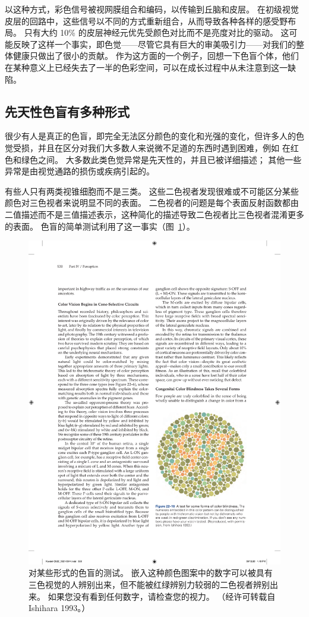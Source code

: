 以这种方式，彩色信号被视网膜组合和编码，以传输到丘脑和皮层。
在初级视觉皮层的回路中，这些信号以不同的方式重新组合，从而导致各种各样的感受野布局。
只有大约 10\% 的皮层神经元优先受颜色对比而不是亮度对比的驱动。
这可能反映了这样一个事实，即色觉——尽管它具有巨大的审美吸引力——对我们的整体健康只做出了很小的贡献。
作为这方面的一个例子，回想一下色盲个体，他们在某种意义上已经失去了一半的色彩空间，可以在成长过程中从未注意到这一缺陷。



\subsection{先天性色盲有多种形式}

很少有人是真正的色盲，即完全无法区分颜色的变化和光强的变化，但许多人的色觉受损，并且在区分对我们大多数人来说微不足道的东西时遇到困难，例如 在红色和绿色之间。
大多数此类色觉异常是先天性的，并且已被详细描述；
其他一些异常是由视觉通路的损伤或疾病引起的。


有些人只有两类视锥细胞而不是三类。
这些二色视者发现很难或不可能区分某些颜色对三色视者来说明显不同的表面。
二色视者的问题是每个表面反射函数都由二值描述而不是三值描述表示，这种简化的描述导致二色视者比三色视者混淆更多的表面。
色盲的简单测试利用了这一事实（图~\ref{fig:22_16}）。


\begin{figure}[htbp]
	\centering
	\includegraphics[width=0.5\linewidth]{chap22/fig_22_16}
	\caption{对某些形式的色盲的测试。 
		嵌入这种颜色图案中的数字可以被具有三色视觉的人辨别出来，但不能被红绿辨别力较弱的二色视者辨别出来。 
		如果您没有看到任何数字，请检查您的视力。 （经许可转载自 Ishihara 1993。）}
	\label{fig:22_16}
\end{figure}



